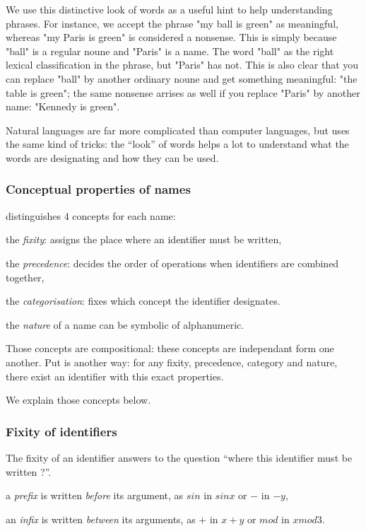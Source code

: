 We use this distinctive look of words as a useful hint to help understanding
phrases. For instance, we accept the phrase "my ball is green" as meaningful,
whereas "my Paris is green" is considered a nonsense. This is simply because
"ball" is a regular noune and "Paris" is a name. The word "ball" as the right
lexical classification in the phrase, but "Paris" has not. This is also clear
that you can replace "ball" by another ordinary noune and get something
meaningful: "the table is green"; the same nonsense arrises as well if you
replace "Paris" by another name: "Kennedy is green".

Natural languages are far more complicated than computer languages, but
{\focalize} uses the same kind of tricks: the ``look'' of words helps a lot to
understand what the words are designating and how they can be used.

\subsubsection{Conceptual properties of names}

{\focal} distinguishes 4 concepts for each name:

\begin{citemize}
\item the {\em fixity}: assigns the place where an identifier must be written,
\item the {\em precedence}: decides the order of operations when
  identifiers are combined together,
\item the {\em categorisation}: fixes which concept the identifier designates.
\item the {\em nature} of a name can be symbolic of alphanumeric.
\end{citemize}

Those concepts are compositional: these concepts are independant form one
another. Put is another way: for any fixity, precedence, category and nature,
there exist an identifier with this exact properties.

We explain those concepts below.

\subsubsection{Fixity of identifiers}

The fixity of an identifier answers to the question ``where this identifier
must be written ?''.
\begin{citemize}
\item a {\em prefix} is written {\em before} its argument, as $sin$ in $sin
  x$ or $-$ in $- y$,
\item an {\em infix} is written {\em between} its arguments, as $+$ in $x +
  y$ or $mod$ in $x mod 3$.
\end{citemize}

